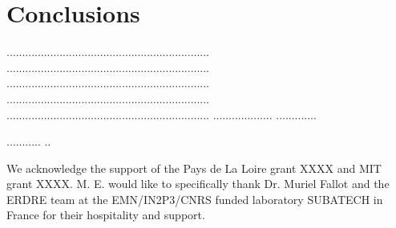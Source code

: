 \documentclass{JINST}
\begin{document}







   



       


\section{Conclusions}
\label{section3}

.................................................................
.................................................................
.................................................................
.................................................................
.................................................................
...................
.............

...........
..

\acknowledgments

       We acknowledge the support of the Pays de La Loire grant XXXX and MIT grant XXXX. M. E.  would
       like to specifically thank Dr. Muriel Fallot and the ERDRE team at the EMN/IN2P3/CNRS funded laboratory SUBATECH in France 
       for their hospitality and support.


{}

\end{document}
